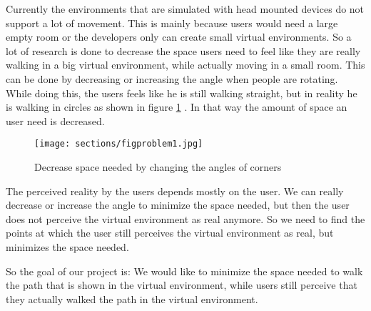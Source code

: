 Currently the environments that are simulated with head mounted devices do not support a lot of movement. This is mainly because users would need a large empty room or the developers only can create small virtual environments. So a lot of research is done to decrease the space users need to feel like they are really walking in a big virtual environment, while actually moving in a small room. This can be done by decreasing or increasing the angle when people are rotating. While doing this, the users feels like he is still walking straight, but in reality he is walking in circles as shown in figure  \ref{figprob1} . In that way the amount of space an user need is decreased.
\begin{figure}[ht!]
\centering
\texttt{[image: sections/figproblem1.jpg]}
\caption{Decrease space needed by changing the angles of corners \label{figprob1}}
\end{figure}
The perceived reality by the users depends mostly on the user. We can really decrease or increase the angle to minimize the space needed, but then the user does not perceive the virtual environment as real anymore. So we need to find the points at which the user still perceives the virtual environment as real, but minimizes the space needed.

So the goal of our project is: We would like to minimize the space needed to walk the path that is shown in the virtual environment, while users still perceive that they actually walked the path in the virtual environment.
